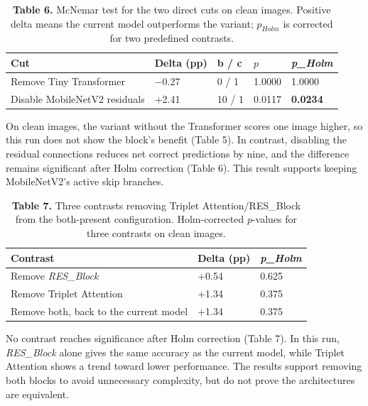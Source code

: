 \begin{table}[H]
\centering
\caption*{\textbf{Table 6.} McNemar test for the two direct cuts on clean images. Positive delta means the current model outperforms the variant; $p_{Holm}$ is corrected for two predefined contrasts.}
\label{tab:6}
\footnotesize
\setlength{\tabcolsep}{3pt}
\renewcommand{\arraystretch}{1.15}
\begin{tabular}{lllll}
\toprule
\textbf{Cut} & \textbf{Delta (pp)} & \textbf{b / c} & $p$ & \emph{\textbf{p\_Holm}} \\
\midrule
Remove Tiny Transformer & −0.27 & 0 / 1 & 1.0000 & 1.0000 \\
Disable MobileNetV2 residuals & +2.41 & 10 / 1 & 0.0117 & \textbf{0.0234} \\
\bottomrule
\end{tabular}
\end{table}

On clean images, the variant without the Transformer scores one image higher, so this run does not show the block's benefit (Table 5). In contrast, disabling the residual connections reduces net correct predictions by nine, and the difference remains significant after Holm correction (Table 6). This result supports keeping MobileNetV2's active skip branches.

\begin{table}[H]
\centering
\caption*{\textbf{Table 7.} Three contrasts removing Triplet Attention/RES\_Block from the both-present configuration. Holm-corrected $p$-values for three contrasts on clean images.}
\label{tab:7}
\small
\renewcommand{\arraystretch}{1.15}
\begin{tabular}{lll}
\toprule
\textbf{Contrast} & \textbf{Delta (pp)} & \emph{\textbf{p\_Holm}} \\
\midrule
Remove \emph{RES\_Block} & +0.54 & 0.625 \\
Remove Triplet Attention & +1.34 & 0.375 \\
Remove both, back to the current model & +1.34 & 0.375 \\
\bottomrule
\end{tabular}
\end{table}

No contrast reaches significance after Holm correction (Table 7). In this run, \emph{RES\_Block} alone gives the same accuracy as the current model, while Triplet Attention shows a trend toward lower performance. The results support removing both blocks to avoid unnecessary complexity, but do not prove the architectures are equivalent.

